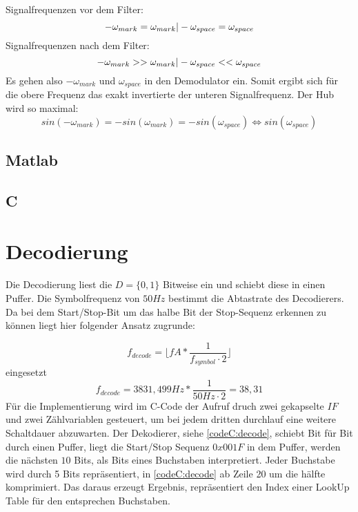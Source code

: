 \documentclass{article}
\begin{document}
Signalfrequenzen vor dem Filter:
$$
-\omega_{mark} = \omega_{mark} \arrowvert -\omega_{space} = \omega_{space} 
$$
Signalfrequenzen nach dem Filter:
$$
-\omega_{mark} >> \omega_{mark} \arrowvert -\omega_{space} << \omega_{space} 
$$
Es gehen also $-\omega_{mark}$ und $\omega_{space}$ in den Demodulator ein.
Somit ergibt sich für die obere Frequenz das exakt invertierte der unteren Signalfrequenz. Der Hub wird so maximal:
$$
sin(-\omega_{mark}) = -sin(\omega_{mark}) = -sin(\omega_{space}) \Longleftrightarrow sin(\omega_{space})
$$
\subsection{Matlab}

\subsection{C}

\section{Decodierung}

Die Decodierung liest die $D = \{0,1\}$ Bitweise ein und schiebt diese in einen Puffer. 
Die Symbolfrequenz von $50Hz$ bestimmt die Abtastrate des Decodierers. Da bei dem Start/Stop-Bit um das
halbe Bit der Stop-Sequenz erkennen zu können liegt hier folgender Ansatz zugrunde:

$$
f_{decode} = \lfloor fA * \frac{1}{f_{symbol} \cdot 2}\rfloor 
$$
eingesetzt
$$
f_{decode} = 3831,499Hz * \frac{1}{50Hz\cdot 2} = 38,31
$$
Für die Implementierung wird im C-Code der Aufruf druch zwei gekapselte $IF$ und zwei Zählvariablen
gesteuert, um bei jedem dritten durchlauf eine weitere Schaltdauer abzuwarten. Der Dekodierer, siehe \ref{codeC:decode}, schiebt Bit für Bit durch einen Puffer, liegt
die Start/Stop Sequenz $0x001F$ in dem Puffer, werden die nächsten $10$ Bits, als Bits eines Buchstaben interpretiert.
Jeder Buchstabe wird durch 5 Bits repräsentiert, in \ref{codeC:decode} ab Zeile 20 um die hälfte komprimiert.
Das daraus erzeugt Ergebnis, repräsentiert den Index einer LookUp Table für den entsprechen Buchstaben.
\end{document}

